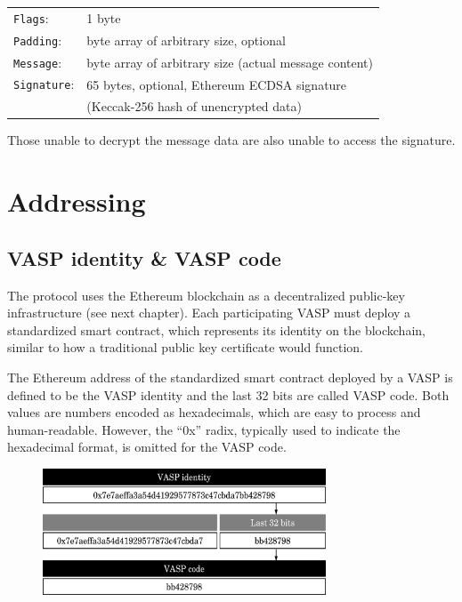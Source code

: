 \documentclass{article}
\begin{document}
    \begin{mdframed}[backgroundcolor=gray!20] 
     \begin{tabular}{ l l }
    \verb+Flags+:&	1 byte\\
    \verb+Padding+:& byte array of arbitrary size, optional\\
    \verb+Message+:& byte array of arbitrary size (actual message content)\\
    \verb+Signature+:& 65 bytes, optional, Ethereum ECDSA signature\\
    &(Keccak-256 hash of unencrypted data)\\
    \end{tabular}
    \end{mdframed}
    
Those unable to decrypt the message data are also unable to access the signature.
\newpage

\section{Addressing}
\subsection{VASP identity \& VASP code}
The protocol uses the Ethereum blockchain as a decentralized public-key infrastructure (see next chapter). Each participating VASP must deploy a standardized smart contract, which represents its identity on the blockchain, similar to how a traditional public key certificate would function.

The Ethereum address of the standardized smart contract deployed by a VASP is defined to be the VASP identity and the last 32 bits are called VASP code. Both values are numbers encoded as hexadecimals, which are easy to process and human-readable. However, the “0x” radix, typically used to indicate the hexadecimal format, is omitted for the VASP code.

\begin{figure}[h]
    \centering
    \includegraphics[width=0.75\textwidth]{g1.pdf}
\end{figure}
\end{document}
